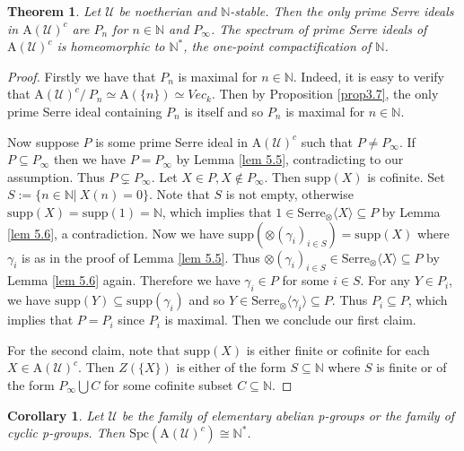 \documentclass[11pt,a4paper]{amsart}
\numberwithin{equation}{section} \theoremstyle{plain}
\newtheorem{cor}[lem]{Corollary}
\newtheorem{thm}[lem]{Theorem}
\begin{document}
\begin{thm}Let $\mathcal{U}$ be  noetherian and $\mathbb{N}$-stable. Then the only prime Serre ideals in $\mathrm{A}(\mathcal{U})^{c}$ are $P_{n}$ for $n\in \mathbb{N}$ and $P_{\infty}$. The spectrum of prime Serre ideals of  $\mathrm{A}(\mathcal{U})^{c}$ is homeomorphic to $\mathbb{N}^{*}$, the one-point compactification of $\mathbb{N}$.
\end{thm}
\begin{proof}Firstly we have that $P_{n}$ is maximal for $n\in \mathbb{N}$. Indeed, it is easy to verify that $\mathrm{A}(\mathcal{U})^{c}/~P_{n}\simeq \mathrm{A}(\{n\})\simeq Vec_{k}$. Then by Proposition \ref{prop3.7}, the only prime Serre ideal containing $P_{n}$ is itself and so $P_{n}$ is maximal for $n\in \mathbb{N}$.

Now suppose $P$ is some prime Serre ideal in $\mathrm{A}(\mathcal{U})^{c}$ such that $P\neq P_{\infty}$. If $P\subseteq P_{\infty}$ then we have $P= P_{\infty}$ by Lemma \ref{lem 5.5}, contradicting to our assumption. Thus $P\varsubsetneq P_{\infty}$. Let $X\in P, X\notin P_{\infty}$. Then $\mathrm{supp}(X)$ is cofinite. Set $S:=\{n\in \mathbb{N}|~X(n)=0\}$. Note that $S$ is not empty, otherwise $\mathrm{supp}(X)=\mathrm{supp}(\mathrm{1})=\mathbb{N}$, which implies that $\mathrm{1}\in \mathrm{Serre}_{\otimes}\langle X\rangle\subseteq P$ by Lemma \ref{lem 5.6}, a contradiction. Now we have $\mathrm{supp}(\otimes(\gamma_{i})_{i\in S})=\mathrm{supp}(X)$ where $\gamma_{i}$ is  as in the proof of Lemma \ref{lem 5.5}. Thus $\otimes(\gamma_{i})_{i\in S}\in \mathrm{Serre}_{\otimes}\langle X\rangle\subseteq P$ by Lemma \ref{lem 5.6} again. Therefore we have $\gamma_{i}\in P$ for some $i\in S$. For any $Y\in P_{i}$, we have $\mathrm{supp}(Y)\subseteq \mathrm{supp}(\gamma_{i})$ and so $Y\in \mathrm{Serre}_{\otimes}\langle \gamma_{i}\rangle\subseteq P$. Thus $P_{i}\subseteq P$, which implies that $P=P_{i}$ since $P_{i}$ is maximal. Then we conclude our first claim.

For the second claim, note that  $\mathrm{supp}(X)$ is  either finite or cofinite for each $X\in \mathrm{A}(\mathcal{U})^{c}$. Then $Z(\{X\})$ is either of the form $S\subseteq \mathbb{N}$ where $S$ is finite or of the form $P_{\infty}\bigcup C$ for some cofinite subset $C\subseteq \mathbb{N}$.
\end{proof}

\begin{cor}Let $\mathcal{U}$ be the family of elementary abelian p-groups or the family of cyclic p-groups. Then $\mathrm{Spc}(\mathrm{A}(\mathcal{U})^{c})\cong \mathbb{N}^{*}$.
\end{cor}
\end{document}
